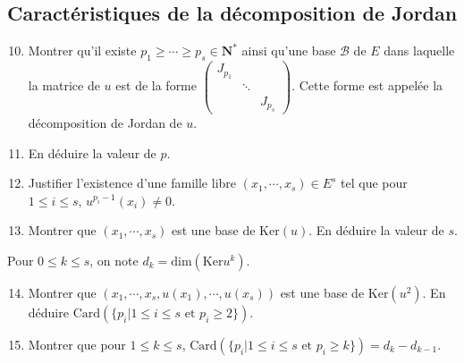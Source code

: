 \documentclass[a4paper,11pt]{article}
\newcommand{\N}{\mathbf{N}}
\begin{document}
	\subsection{Caractéristiques de la décomposition de Jordan}
	\begin{enumerate}
	\setcounter{enumi}{9}
	\item Montrer qu'il existe $p_1\geq\cdots\geq p_s\in\N^*$ ainsi qu'une base $\mathcal{B}$ de $E$ dans laquelle la matrice de $u$ est de la forme $\begin{pmatrix}
	J_{p_1}&\\&\ddots&\\&&J_{p_s}
	\end{pmatrix}$. Cette forme est appelée la décomposition de Jordan de $u$.
	\item En déduire la valeur de $p$.
	\item Justifier l'existence d'une famille libre $(x_1,\cdots,x_s)\in E^s$ tel que pour $1\leq i\leq s$, $u^{p_i-1}(x_i)\neq 0$.
	\item Montrer que $(x_1,\cdots,x_s)$ est une base de $\mathrm{Ker}(u)$. En déduire la valeur de $s$.
	\end{enumerate}
	Pour $0\leq k\leq s$, on note $d_k=\mathrm{dim}\left(\mathrm{Ker}u^k\right)$.
	\begin{enumerate}
	\setcounter{enumi}{13}
	\item Montrer que $(x_1,\cdots,x_s,u(x_1),\cdots,u(x_s))$ est une base de $\mathrm{Ker}(u^2)$. En déduire $\mathrm{Card}\left(\{p_i\vert 1\leq i\leq s\text{ et }p_i\geq 2\}\right)$.
	\item Montrer que pour $1\leq k\leq s$, $\mathrm{Card}\left(\{p_i\vert 1\leq i\leq s\text{ et }p_i\geq k\}\right)=d_{k}-d_{k-1}$.
	\end{enumerate}
	
\end{document}
